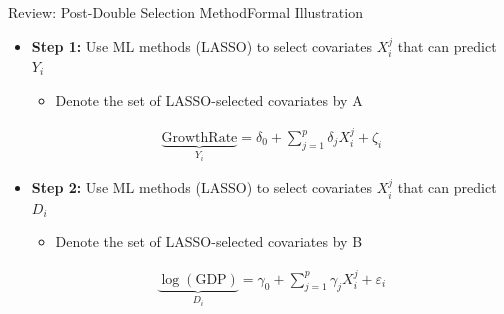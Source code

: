 \documentclass[dvipsnames,hyperref={pdfpagelabels=false}]{beamer}
\begin{document}
\begin{frame}{Review: Post-Double Selection Method}{Formal Illustration}

\begin{itemize}



\item \textbf{Step 1:} Use ML methods (LASSO) to select covariates $X^{j}_{i}$ that can predict $Y_{i}$
\vspace{0.3cm}
\begin{itemize}
\item Denote the set of LASSO-selected covariates by A
\end{itemize}
\begin{eqnarray*}
\underbrace{\mbox{GrowthRate}}_{Y_{i}} = \delta_{0} + \sum^{p}_{j=1} \delta_{j} X^{j}_{i}  + \zeta_{i}
\end{eqnarray*}


\vspace{0.3cm}
\item \textbf{Step 2:} Use ML methods (LASSO) to select covariates $X^{j}_{i}$ that can predict $D_{i}$ 
\vspace{0.3cm}
\begin{itemize}
\item Denote the set of LASSO-selected covariates by B
\end{itemize}
\begin{eqnarray*}
\underbrace{\log(\mbox{GDP})}_{D_{i}} = \gamma_{0} +  \sum^{p}_{j=1} \gamma_{j} X^{j}_{i}  + \varepsilon_{i}
\end{eqnarray*}


\end{itemize}

\end{frame}
\end{document}
